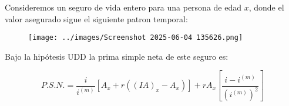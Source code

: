 \begin{theorem}
    Consideremos un seguro de vida entero para una persona de edad $x$, donde el valor asegurado sigue el siguiente patron temporal:
    
    \begin{figure}[H]
        \center
        \texttt{[image: ../images/Screenshot 2025-06-04 135626.png]}
    \end{figure}
    
    Bajo la hipótesis UDD la prima simple neta de este seguro es:

    \begin{equation}
        P.S.N. = \frac{i}{i^{(m)}}[A_x + r((IA)_x - A_x)] + r A_x \left[\frac{i - i^{(m)}}{\left(i^{(m)}\right)^2}\right]
    \end{equation}

\end{theorem}
    
